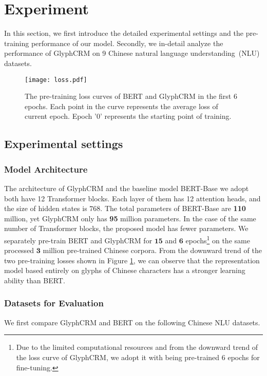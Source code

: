\section{Experiment}
In this section, we first introduce the detailed experimental settings and the pre-training performance of our model. Secondly, we in-detail analyze the performance of GlyphCRM on 9 Chinese natural language understanding~(NLU) datasets.   

\begin{figure}[t]
    \centering
    \texttt{[image: loss.pdf]}
    \caption{The pre-training loss curves of BERT and GlyphCRM in the first 6 epochs. Each point in the curve represents the average loss of current epoch. Epoch '0' represents the starting point of training. }
    \label{fig:loss}
\end{figure}

\subsection{Experimental settings}

\subsubsection{Model Architecture} The architecture of GlyphCRM and the baseline model BERT-Base we adopt both have 12 Transformer blocks. Each layer of them has 12 attention heads, and the size of hidden states is $768$. The total parameters of BERT-Base are \textbf{110} million, yet GlyphCRM only has \textbf{95} million parameters. In the case of the same number of Transformer blocks, the proposed model has fewer parameters. We separately pre-train BERT and GlyphCRM for $\textbf{15}$ and $\textbf{6}$ epochs\footnote{ Due to the limited computational resources and from the downward trend of the loss curve of GlyphCRM, we adopt it with being pre-trained 6 epochs for fine-tuning.} on the same processed $\textbf{3}$ million pre-trained Chinese corpora. From the downward trend of the two pre-training losses shown in Figure \ref{fig:loss}, we can observe that the representation model based entirely on glyphs of Chinese characters has a stronger learning ability than BERT. 



\subsubsection{Datasets for Evaluation} We first compare GlyphCRM and BERT on the following Chinese NLU datasets. 

